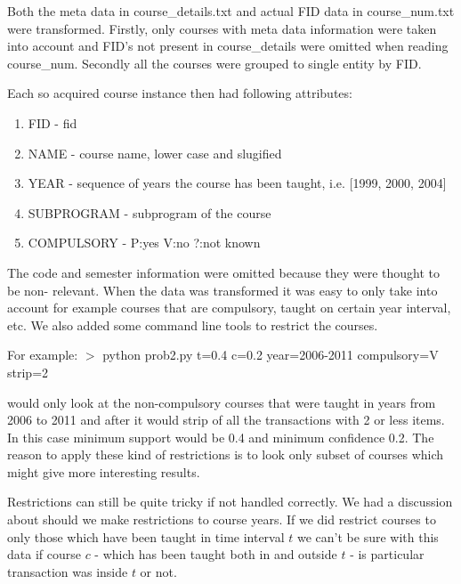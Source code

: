 Both the meta data in course\_details.txt and actual FID data in course\_num.txt were transformed.
Firstly, only courses with meta data information were taken into account and FID's not present in
course\_details were omitted when reading course\_num. Secondly all the courses were grouped 
to single entity by FID. 

Each so acquired course instance then had following attributes:
\begin{enumerate}
\item FID - fid
\item NAME - course name, lower case and slugified
\item YEAR - sequence of years the course has been taught, i.e. [1999, 2000, 2004]
\item SUBPROGRAM - subprogram of the course
\item COMPULSORY - P:yes V:no ?:not known
\end{enumerate}

The code and semester information were omitted because they were thought to be non- relevant.
When the data was transformed it was easy to only take into account for example courses that are
compulsory, taught on certain year interval, etc. We also added some command line tools to restrict the courses. 
\newline

For example:\newline
$>$ python prob2.py t=0.4 c=0.2 year=2006-2011 compulsory=V strip=2
\newline

would only look at the non-compulsory courses that were taught in years from 2006 to 2011 and 
after it would strip of all the transactions with 2 or less items.  In this case minimum support would be
0.4 and minimum confidence 0.2. The reason to apply these kind of restrictions is to look only 
subset of courses which might give more interesting results.
\newline


Restrictions can still be quite tricky if not handled correctly. We had a discussion about should we
make restrictions to course years. If we
did restrict courses to only those which have been taught in time interval $t$ we can't be sure with this
data if course $c$ - which has been taught both in and outside $t$ - is particular transaction was inside $t$ or not. 

